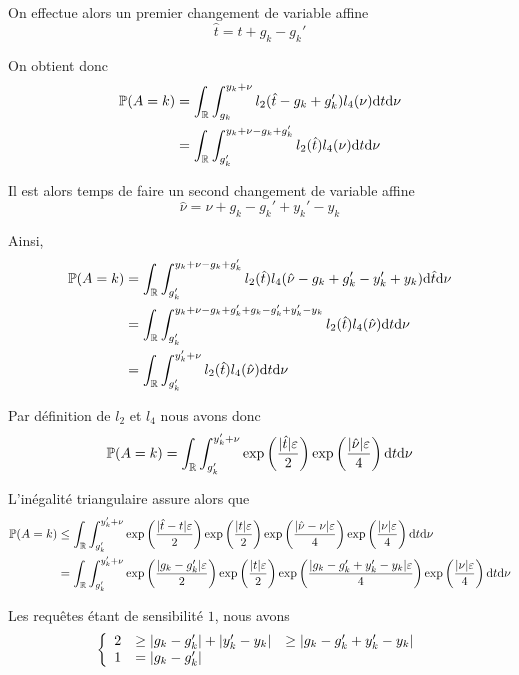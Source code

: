 On effectue alors un premier changement de variable affine 
\[
    \hat t = t + g_k - g_k'    
\]

On obtient donc 
\begin{align*}
    \mathbb P(A = k) & = \int_{\mathbb{R}}\int_{g_k}^{y_k + \nu} l_2(\hat t - g_k + g_k')l_4(\nu) \mathrm{d}  t \mathrm{d} \nu\\
    & = \int_{\mathbb{R}}\int_{g_k'}^{y_k + \nu - g_k + g_k'} l_2(\hat t )l_4(\nu) \mathrm{d}  t \mathrm{d} \nu\\
\end{align*}

Il est alors temps de faire un second changement de variable affine
\[
    \hat \nu = \nu + g_k - g_k' + y_k' - y_k   
\]

Ainsi,
\begin{align*}
    \mathbb P(A = k) & = \int_{\mathbb{R}}\int_{g_k'}^{y_k + \nu - g_k + g_k' } l_2(\hat t )l_4(\hat\nu - g_k + g_k' - y_k' + y_k) \mathrm{d} \hat t \mathrm{d} \nu\\
    & = \int_{\mathbb{R}}\int_{g_k'}^{y_k + \nu  - g_k +g_k'  + g_k - g_k' +y_k' - y_k} l_2(\hat t )l_4(\hat\nu) \mathrm{d}  t \mathrm{d} \nu\\
    & = \int_{\mathbb{R}}\int_{g_k'}^{y_k' + \nu } l_2(\hat t )l_4(\hat\nu) \mathrm{d} t \mathrm{d} \nu\\
\end{align*}

Par définition de \(l_2\) et \(l_4\) nous avons donc
\begin{align*}
    \mathbb P(A = k) & =  \int_{\mathbb{R}}\int_{g_k'}^{y_k' + \nu } \exp\left(\dfrac{|\hat t|\varepsilon}{2}\right)\exp\left(\dfrac{|\hat\nu|\varepsilon}{4}\right) \mathrm{d} t \mathrm{d} \nu\\
\end{align*}

L'inégalité triangulaire assure alors que 
\begin{align*}
    \mathbb P(A = k) & \leq  \int_{\mathbb{R}}\int_{g_k'}^{y_k' + \nu } \exp\left(\dfrac{|\hat t - t|\varepsilon}{2}\right)\exp\left(\dfrac{|t|\varepsilon}{2}\right)\exp\left(\dfrac{|\hat\nu - \nu|\varepsilon}{4}\right)\exp\left(\dfrac{|\nu|\varepsilon}{4}\right) \mathrm{d} t \mathrm{d} \nu\\
    & =  \int_{\mathbb{R}}\int_{g_k'}^{y_k' + \nu } \exp\left(\dfrac{| g_k - g_k' |\varepsilon}{2}\right)\exp\left(\dfrac{|t|\varepsilon}{2}\right)\exp\left(\dfrac{|g_k - g_k' + y_k' - y_k |\varepsilon}{4}\right)\exp\left(\dfrac{|\nu|\varepsilon}{4}\right) \mathrm{d}  t \mathrm{d} \nu\\
\end{align*}

Les requêtes étant de sensibilité \(1\), nous avons 
\[
    \left\{ 
        \begin{array}[]{rlc}
            2 & \geq |g_k - g_k'| + |y_k' - y_k | & \geq|g_k - g_k' + y_k' - y_k | \\
            1 & = | g_k - g_k' | \\
        \end{array}
    \right.    
\]

